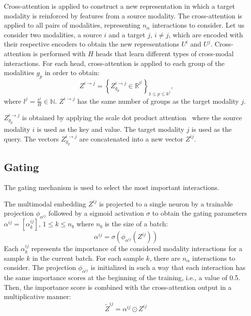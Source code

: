 \documentclass[../main.tex]{subfiles}
\begin{document}
     Cross-attention is applied to construct a new representation in which a target modality is reinforced by features from a source modality.
     The cross-attention is applied to all pairs of modalities, representing \(n_{\alpha}\) interactions to consider.
     Let us consider two modalities, a source \(i\) and a target \(j\), \(i \neq j\), which are encoded with their respective encoders to obtain the new representations \(U^i\) and \(U^j\).
     Cross-attention is performed with $H$ heads that learn different types of cross-modal interactions.
     For each head, cross-attention is applied to each group of the modalities \(g_p\) in order to obtain:
     \[ Z^{i\rightarrow j} = \left\{ Z^{i\rightarrow j}_{g_p} \in \mathbb{R}^{l^j} \right\}_{1 \leq p \leq k^j}\text{,}\]
     where $l^j = \frac{s^j}{H} \in \mathbb{N}$.
     \( Z^{i\rightarrow j}\) has the same number of groups as the target modality $j$.

     \(Z^{i\rightarrow j}_{g_p}\) is obtained by applying the scale dot product attention~\cite{AttentionAllYouNeed} where the source modality \(i\) is used as the key and value.
     The target modality \(j\) is used as the query.
     The vectors \(Z^{i\rightarrow j}_{g_p}\) are concatenated into a new vector \(Z^{ij}\).

 \subsection{Gating}
     The gating mechanism is used to select the most important interactions.

     The multimodal embedding \(Z^{ij}\) is projected to a single neuron by a trainable projection \(\phi_{\alpha^{ij}}\) followed by a sigmoid activation \(\sigma\) to obtain the gating parameters \(\alpha^{ij} = \left[\alpha^{ij}_{k}\right]\), \(1 \leq k \leq n_b\) where \(n_b\) is the size of a batch:
     \begin{equation}
         \alpha^{ij} = \sigma \left( \phi_{\alpha^{ij}}\left( Z^{ij} \right)\right)
         \label{eq:gate_alpha}
     \end{equation}
     Each \(\alpha^{ij}_{k}\) represents the importance of the considered modality interactions for a sample \(k\) in the current batch.
     For each sample \(k\), there are \(n_{\alpha}\) interactions to consider.
     The projection \(\phi_{\alpha^{ij}}\) is initialized in such a way that each interaction has the same importance scores at the beginning of the training, i.e., a value of 0.5.
     Then, the importance score is combined with the cross-attention output in a multiplicative manner:
     \[ \tilde{Z}^{ij} = \alpha^{ij} \odot Z^{ij} \]
\end{document}
